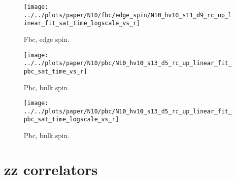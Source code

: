 \documentclass[a4paper]{article}
\begin{document}
\begin{figure}[h]
  \centering
  \texttt{[image: ../../plots/paper/N10/fbc/edge\_spin/N10\_hv10\_s11\_d9\_rc\_up\_linear\_fit\_sat\_time\_logscale\_vs\_r]}
  \caption{Fbc, edge spin.}
\end{figure}

\clearpage
\begin{figure}[h]
  \centering
  \texttt{[image: ../../plots/paper/N10/pbc/N10\_hv10\_s13\_d5\_rc\_up\_linear\_fit\_pbc\_sat\_time\_vs\_r]}
  \caption{Pbc, bulk spin.}
\end{figure}

\begin{figure}[h]
  \centering
  \texttt{[image: ../../plots/paper/N10/pbc/N10\_hv10\_s13\_d5\_rc\_up\_linear\_fit\_pbc\_sat\_time\_logscale\_vs\_r]}
  \caption{Pbc, bulk spin.}
\end{figure}

\clearpage
\section{zz correlators}
\end{document}
